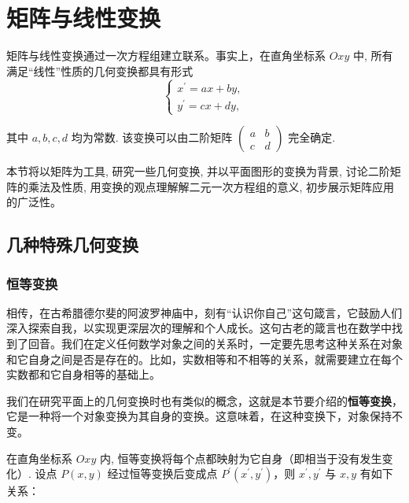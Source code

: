 \section{矩阵与线性变换}
\label{sec:矩阵与线性变换}

\begin{note}
    矩阵与线性变换通过一次方程组建立联系。事实上，在直角坐标系 $O x y$ 中, 所有满足“线性”性质的几何变换都具有形式
$$
\left\{\begin{array}{l}
x^{\prime}=a x+b y, \\
y^{\prime}=c x+d y,
\end{array}\right.
$$

其中 $a, b, c, d$ 均为常数. 该变换可以由二阶矩阵 $\left(\begin{array}{ll}a & b \\ c & d\end{array}\right)$ 完全确定.
\end{note}

本节将以矩阵为工具, 研究一些几何变换, 并以平面图形的变换为背景, 讨论二阶矩阵的乘法及性质, 用变换的观点理解解二元一次方程组的意义, 初步展示矩阵应用的广泛性。

\subsection{几种特殊几何变换}
\label{subsec:几种特殊几何变换}

\subsubsection{恒等变换}
\label{subsubsec:恒等变换}

相传，在古希腊德尔斐的阿波罗神庙中，刻有“认识你自己”这句箴言，它鼓励人们深入探索自我，以实现更深层次的理解和个人成长。这句古老的箴言也在数学中找到了回音。我们在定义任何数学对象之间的关系时，一定要先思考这种关系在对象和它自身之间是否是存在的。比如，实数相等和不相等的关系，就需要建立在每个实数都和它自身相等的基础上。

我们在研究平面上的几何变换时也有类似的概念，这就是本节要介绍的\textcolor{third}{\bf 恒等变换}，它是一种将一个对象变换为其自身的变换。这意味着，在这种变换下，对象保持不变。

 在直角坐标系 $O x y$ 内, 恒等变换将每个点都映射为它自身（即相当于没有发生变化）. 设点 $P(x, y)$ 经过恒等变换后变成点 $P^{\prime}\left(x^{\prime}, y^{\prime}\right)$，则 $x^{\prime}, y^{\prime}$ 与 $x, y$ 有如下关系：

